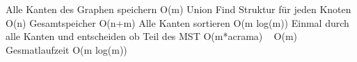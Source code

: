 Alle Kanten des Graphen speichern O(m)
Union Find Struktur für jeden Knoten O(n)
Gesamtspeicher O(n+m)
Alle Kanten sortieren O(m \cdot log(m))
Einmal durch alle Kanten und entscheiden ob Teil des MST
O(m*acrama) ~ O(m)
Gesmatlaufzeit O(m \cdot log(m))





